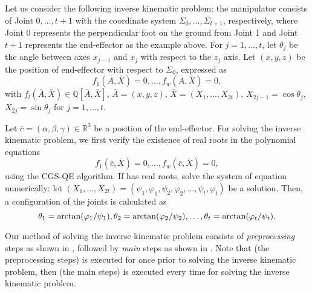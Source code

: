 \documentclass{birkjour}
\theoremstyle{plain}
\theoremstyle{definition}
\newcommand{\R}[0]{\mathbb{R}}
\newcommand{\Q}[0]{\mathbb{Q}}
\newcommand{\Abar}{\bar{A}}
\newcommand{\Xbar}{\bar{X}}
\begin{document}
    Let us consider the following inverse kinematic problem: 
    the manipulator consists of Joint $0,\dots,t+1$ with the coordinate system
    $\Sigma_0,\dots,\Sigma_{t+1}$, respectively, where
    Joint 0 represents the perpendicular foot on the ground from Joint 1 and
    Joint $t+1$ represents the end-effector as the example above.
    For $j=1,\dots,t$, let $\theta_j$ be the angle between axes $x_{j-1}$ and $x_j$
    with respect to the $z_j$ axis. 
    Let $(x,y,z)$ be the position of end-effector with respect to $\Sigma_0$,
    expressed as
    \begin{equation}
        \label{eq:cgsqe-inverse-kinematics}
        f_1(\bar{A},\bar{X})=0,\dots,f_w(\bar{A},\bar{X})=0,
    \end{equation}
    with $f_l(\bar{A},\bar{X})\in\Q[\bar{A},\bar{X}]$, 
    $\bar{A}=(x,y,z)$, $\bar{X}=(X_1,\dots,X_{2t})$,
    $X_{2j-1}=\cos\theta_j$, $X_{2j}=\sin\theta_j$ for $j=1,\dots,t$.
    
    Let $\bar{c}=(\alpha,\beta,\gamma)\in\R^3$ be 
    a position of the end-effector.
    For solving the inverse kinematic problem, we first verify the existence of 
    real roots in the polynomial equations
    \begin{equation}
        \label{eq:cgsqe-inverse-kinematics-equations}
        f_1(\bar{c},\bar{X})=0,\dots,f_w(\bar{c},\bar{X})=0,
    \end{equation}
    using the CGS-QE algorithm.
    If  has real roots, 
    solve the system of equation numerically:
    let $(X_1,\dots,X_{2t})=(\psi_1,\varphi_1,\psi_2,\varphi_2,\dots,\psi_t,\varphi_{t})$
    be a solution.
    Then, a configuration of the joints is calculated as
    \begin{equation}
        \label{eq:cgsqe-inverse-kinematics-configuration}
        \theta_1=\arctan(\varphi_1/\psi_1),
        \theta_2=\arctan(\varphi_2/\psi_2),\ldots,\\
        \theta_t=\arctan(\varphi_{t}/\psi_{t}).
    \end{equation}
    
    Our method of solving the inverse kinematic problem consists of 
    \textit{preprocessing} steps as shown in ,
    followed by \textit{main} steps as shown in .
    Note that  (the preprocessing steps) is executed for once 
    prior to solving the inverse kinematic problem, 
    then  (the main steps) is executed every time for solving the 
    inverse kinematic problem.
\end{document}
